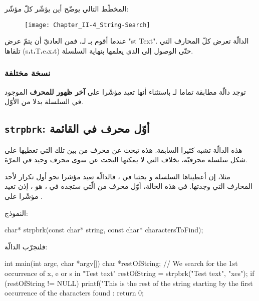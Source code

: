 المخطّط التالي يوضّح أين يؤشّر كلّ مؤشّر:

\begin{figure}[H]
	\centering
	\texttt{[image: Chapter\_II-4\_String-Search]}
\end{figure}

عندما أقوم بـ
لـ،
فمن العاديّ أن يتمّ عرض
"\textenglish{st  Text}".
الدالّة
تعرض كلّ المحارف التي تلقاها
(\textenglish{s}،\textenglish{t}،\textenglish{T}،\textenglish{e}،\textenglish{x}،\textenglish{t})
حتّى الوصول إلى
الذي يعلمها بنهاية السلسلة.

\subsubsection{نسخة مختلفة}

توجد دالّة
مطابقة تماما لـ
باستثناء أنها تعيد مؤشّرا على
\textbf{آخر ظهور للمحرف}
الموجود في السلسلة بدلا من الأوّل.

\subsection{\texttt{strpbrk}: أوّل محرف في القائمة}

هذه الدالّة تشبه كثيرا السابقة. هذه تبحث عن محرف من بين تلك التي تعطيها على شكل سلسلة محرفيّة، بخلاف
التي لا يمكنها البحث عن سوى محرف وحيد في المرّة.

مثلا، إن أعطيناها السلسلة
و بحثنا في
،
فالدالّة تعيد مؤشرا نحو أول تكرار لأحد المحارف التي وجدتها.
في هذه الحالة، أوّل محرف من
الّتي ستجده في
،
هو ، إذن
تعيد مؤشّرا على
.

النموذج:

\begin{Csource}
char* strpbrk(const char* string, const char* charactersToFind);
\end{Csource}

فلنجرّب الدالّة:

\begin{Csource}
int main(int argc, char *argv[])
{
	char *restOfString;
	// We search for the 1st occurrence of x, e or s in "Test text"
	restOfString = strpbrk("Test text", "xes");
	if (restOfString != NULL)
	 {
    		printf("This is the rest of the string starting by the first occurrence of the characters found : %
	}
	return 0;
}
\end{Csource}

